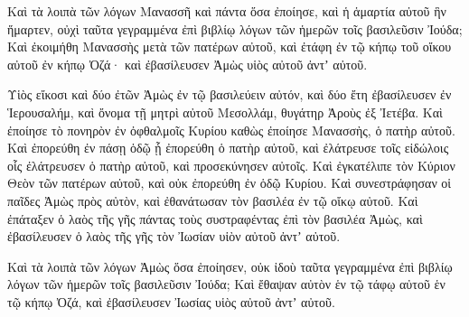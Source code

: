 {\par }{\PP {}Καὶ τὰ λοιπὰ τῶν λόγων Μανασσῆ καὶ πάντα ὅσα ἐποίησε, καὶ ἡ ἁμαρτία αὐτοῦ ἣν ἥμαρτεν, οὐχὶ ταῦτα γεγραμμένα ἐπὶ βιβλίῳ λόγων τῶν ἡμερῶν τοῖς βασιλεῦσιν Ἰούδα;
Καὶ ἐκοιμήθη Μανασσὴς μετὰ τῶν πατέρων αὐτοῦ, καὶ ἐτάφη ἐν τῷ κήπῳ τοῦ οἴκου αὐτοῦ ἐν κήπῳ Ὀζά· καὶ ἐβασίλευσεν Ἀμὼς υἱὸς αὐτοῦ ἀντʼ αὐτοῦ.
\par }{\PP {}Υἱὸς εἴκοσι καὶ δύο ἐτῶν Ἀμὼς ἐν τῷ βασιλεύειν αὐτόν, καὶ δύο ἔτη ἐβασίλευσεν ἐν Ἱερουσαλήμ, καὶ ὄνομα τῇ μητρὶ αὐτοῦ Μεσολλάμ, θυγάτηρ Ἀροὺς ἐξ Ἰετέβα.
Καὶ ἐποίησε τὸ πονηρὸν ἐν ὀφθαλμοῖς Κυρίου καθὼς ἐποίησε Μανασσὴς, ὁ πατὴρ αὐτοῦ.
Καὶ ἐπορεύθη ἐν πάσῃ ὁδῷ ᾗ ἐπορεύθη ὁ πατὴρ αὐτοῦ, καὶ ἐλάτρευσε τοῖς εἰδώλοις οἷς ἐλάτρευσεν ὁ πατὴρ αὐτοῦ, καὶ προσεκύνησεν αὐτοῖς.
Καὶ ἐγκατέλιπε τὸν Κύριον Θεὸν τῶν πατέρων αὐτοῦ, καὶ οὐκ ἐπορεύθη ἐν ὁδῷ Κυρίου.
Καὶ συνεστράφησαν οἱ παῖδες Ἀμὼς πρὸς αὐτὸν, καὶ ἐθανάτωσαν τὸν βασιλέα ἐν τῷ οἴκῳ αὐτοῦ.
Καὶ ἐπάταξεν ὁ λαὸς τῆς γῆς πάντας τοὺς συστραφέντας ἐπὶ τὸν βασιλέα Ἀμὼς, καὶ ἐβασίλευσεν ὁ λαὸς τῆς γῆς τὸν Ἰωσίαν υἱὸν αὐτοῦ ἀντʼ αὐτοῦ.
\par }{\PP {}Καὶ τὰ λοιπὰ τῶν λόγων Ἀμὼς ὅσα ἐποίησεν, οὐκ ἰδοὺ ταῦτα γεγραμμένα ἐπὶ βιβλίῳ λόγων τῶν ἡμερῶν τοῖς βασιλεῦσιν Ἰούδα;
Καὶ ἔθαψαν αὐτὸν ἑν τῷ τάφῳ αὐτοῦ ἑν τῷ κήπῳ Ὀζά, καὶ ἐβασίλευσεν Ἰωσίας υἱὸς αὐτοῦ ἀντʼ αὐτοῦ.

}

